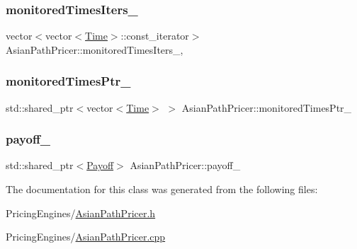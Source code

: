 \hypertarget{class_asian_path_pricer_acad7de97a262edf4e9f0ebb5f70e81f1}{}\label{class_asian_path_pricer_acad7de97a262edf4e9f0ebb5f70e81f1} 
\subsubsection{\texorpdfstring{monitored\+Times\+Iters\+\_\+}{monitoredTimesIters\_}}
{\footnotesize\ttfamily vector$<$vector$<$\hyperlink{_name_def_8h_ac2d3e0ba793497bcca555c7c2cf64ff3}{Time}$>$\+::const\+\_\+iterator$>$ Asian\+Path\+Pricer\+::monitored\+Times\+Iters\+\_\+\hspace{0.3cm}{\ttfamily [mutable]}, {\ttfamily [private]}}

\hypertarget{class_asian_path_pricer_aa774ae5f2659aee3a7b5e40b3089c3be}{}\label{class_asian_path_pricer_aa774ae5f2659aee3a7b5e40b3089c3be} 
\subsubsection{\texorpdfstring{monitored\+Times\+Ptr\+\_\+}{monitoredTimesPtr\_}}
{\footnotesize\ttfamily std\+::shared\+\_\+ptr$<$vector$<$\hyperlink{_name_def_8h_ac2d3e0ba793497bcca555c7c2cf64ff3}{Time}$>$ $>$ Asian\+Path\+Pricer\+::monitored\+Times\+Ptr\+\_\+\hspace{0.3cm}{\ttfamily [private]}}

\hypertarget{class_asian_path_pricer_a21540fed13894f9f62828d9817de8f5f}{}\label{class_asian_path_pricer_a21540fed13894f9f62828d9817de8f5f} 
\subsubsection{\texorpdfstring{payoff\+\_\+}{payoff\_}}
{\footnotesize\ttfamily std\+::shared\+\_\+ptr$<$\hyperlink{class_payoff}{Payoff}$>$ Asian\+Path\+Pricer\+::payoff\+\_\+\hspace{0.3cm}{\ttfamily [private]}}



The documentation for this class was generated from the following files\+:\begin{DoxyCompactItemize}
\item 
Pricing\+Engines/\hyperlink{_asian_path_pricer_8h}{Asian\+Path\+Pricer.\+h}\item 
Pricing\+Engines/\hyperlink{_asian_path_pricer_8cpp}{Asian\+Path\+Pricer.\+cpp}\end{DoxyCompactItemize}
